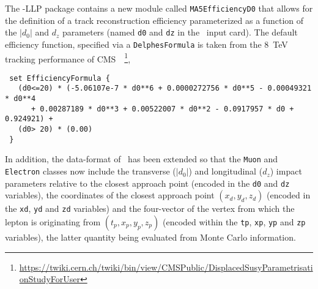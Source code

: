 The \DEL-LLP package contains a new module called \verb+MA5EfficiencyD0+ that
allows for the definition of a track reconstruction efficiency parameterized as a function of the $|d_0|$ and $d_z$ parameters (named \verb+d0+ and \verb+dz+ in the \DEL\ input
card). The default efficiency function, specified via a \verb+DelphesFormula+ is taken from the
8~TeV tracking performance of CMS~\cite{Khachatryan:2014mea}~\footnote{\url{https://twiki.cern.ch/twiki/bin/view/CMSPublic/DisplacedSusyParametrisationStudyForUser}},\\
\begin{verbatim}
 set EfficiencyFormula {
   (d0<=20) * (-5.06107e-7 * d0**6 + 0.0000272756 * d0**5 - 0.00049321 * d0**4
      + 0.00287189 * d0**3 + 0.00522007 * d0**2 - 0.0917957 * d0 +  0.924921) +
   (d0> 20) * (0.00)
 }
\end{verbatim}
In addition, the data-format of \DEL\ has been extended so that the \verb+Muon+ and
\verb+Electron+ classes now include the transverse ($|d_0|$) and longitudinal ($d_z$) impact parameters relative to the closest approach point (encoded
in the \verb+d0+ and \verb+dz+ variables), the coordinates of the closest
approach point $(x_d, y_d, z_d)$ (encoded in the \verb+xd+, \verb+yd+ and
\verb+zd+ variables) and the four-vector of the vertex from which the lepton is
originating from $(t_p, x_p, y_p, z_p)$ (encoded within the \verb+tp+,
\verb+xp+, \verb+yp+ and \verb+zp+ variables), the latter quantity being
evaluated from Monte Carlo information.

